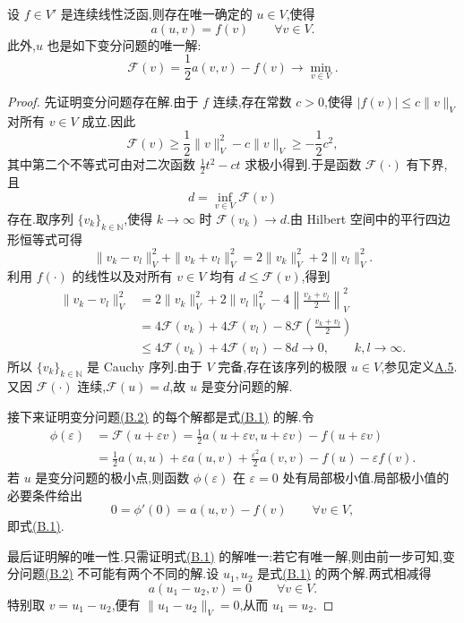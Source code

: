 \begin{theorem}\label{thm:appendix-b-3}
设 $f\in V'$ 是连续线性泛函,则存在唯一确定的 $u\in V$,使得
\begin{equation}\label{eq:appendix-b-1}
 a(u,v)=f(v)\qquad \forall v\in V.
\end{equation}
此外,$u$ 也是如下变分问题的唯一解:
\begin{equation}\label{eq:appendix-b-2}
 \mathcal F(v)=\frac12a(v,v)-f(v)\longrightarrow
 \min_{v\in V}.
\end{equation}
\end{theorem}
\begin{proof}
先证明变分问题存在解.由于 $f$ 连续,存在常数 $c>0$,使得
$|f(v)|\le c\|v\|_V$ 对所有 $v\in V$ 成立.因此
\[
 \mathcal F(v)\ge \frac12\|v\|_V^2-c\|v\|_V
 \ge -\frac12c^2,
\]
其中第二个不等式可由对二次函数 $\frac12t^2-ct$ 求极小得到.于是函数 $\mathcal F(\cdot)$ 有下界,且
\[
 d=\inf_{v\in V}\mathcal F(v)
\]
存在.取序列 $\{v_k\}_{k\in\mathbb N}$,使得 $k\to\infty$ 时
$\mathcal F(v_k)\to d$.由 Hilbert 空间中的平行四边形恒等式可得
\[
 \|v_k-v_l\|_V^2+\|v_k+v_l\|_V^2
 =2\|v_k\|_V^2+2\|v_l\|_V^2.
\]
利用 $f(\cdot)$ 的线性以及对所有 $v\in V$ 均有 $d\le\mathcal F(v)$,得到
\begin{align*}
 \|v_k-v_l\|_V^2
 &=2\|v_k\|_V^2+2\|v_l\|_V^2
   -4\left\|\frac{v_k+v_l}{2}\right\|_V^2\\
 &=4\mathcal F(v_k)+4\mathcal F(v_l)
   -8\mathcal F\left(\frac{v_k+v_l}{2}\right)\\
 &\le 4\mathcal F(v_k)+4\mathcal F(v_l)-8d
 \longrightarrow 0,\qquad k,l\to\infty.
\end{align*}
所以 $\{v_k\}_{k\in\mathbb N}$ 是 Cauchy 序列.由于 $V$ 完备,存在该序列的极限 $u\in V$,参见定义\hyperref[def:appendix-a-5]{A.5}.又因 $\mathcal F(\cdot)$ 连续,$\mathcal F(u)=d$,故 $u$ 是变分问题的解.

接下来证明变分问题\hyperref[eq:appendix-b-2]{(B.2)} 的每个解都是式\hyperref[eq:appendix-b-1]{(B.1)} 的解.令
\[
\begin{aligned}
 \phi(\varepsilon)
 &=\mathcal F(u+\varepsilon v)
 =\frac12a(u+\varepsilon v,u+\varepsilon v)-f(u+\varepsilon v)\\
 &=\frac12a(u,u)+\varepsilon a(u,v)
   +\frac{\varepsilon^2}{2}a(v,v)-f(u)-\varepsilon f(v).
\end{aligned}
\]
若 $u$ 是变分问题的极小点,则函数 $\phi(\varepsilon)$ 在 $\varepsilon=0$ 处有局部极小值.局部极小值的必要条件给出
\[
 0=\phi'(0)=a(u,v)-f(v)\qquad \forall v\in V,
\]
即式\hyperref[eq:appendix-b-1]{(B.1)}.

最后证明解的唯一性.只需证明式\hyperref[eq:appendix-b-1]{(B.1)} 的解唯一:若它有唯一解,则由前一步可知,变分问题\hyperref[eq:appendix-b-2]{(B.2)} 不可能有两个不同的解.设 $u_1,u_2$ 是式\hyperref[eq:appendix-b-1]{(B.1)} 的两个解.两式相减得
\[
 a(u_1-u_2,v)=0\qquad \forall v\in V.
\]
特别取 $v=u_1-u_2$,便有 $\|u_1-u_2\|_V=0$,从而 $u_1=u_2$.
\end{proof}


